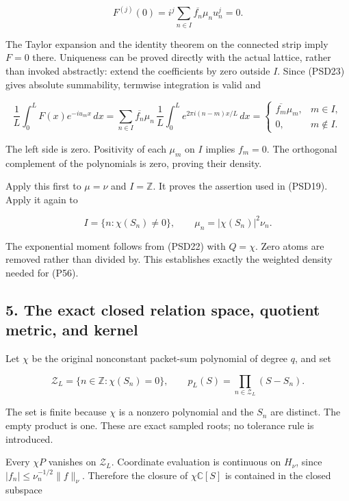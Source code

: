 \[
F^{(j)}(0)=i^j\sum_{n\in I}\overline{f_n}\mu_nu_n^j=0.
\tag{PSD25}
\]

The Taylor expansion and the identity theorem on the connected strip imply \(F=0\) there. Uniqueness can be proved directly with the actual lattice, rather than invoked abstractly: extend the coefficients by zero outside \(I\). Since (PSD23) gives absolute summability, termwise integration is valid and

\[
\frac1L\int_0^L F(x)e^{-iu_mx}\,dx
=\sum_{n\in I}\overline{f_n}\mu_n\,
\frac1L\int_0^L e^{2\pi i(n-m)x/L}\,dx
=\begin{cases}\overline{f_m}\mu_m,&m\in I,\\0,&m\notin I.\end{cases}
\tag{PSD26}
\]

The left side is zero. Positivity of each \(\mu_m\) on \(I\) implies \(f_m=0\). The orthogonal complement of the polynomials is zero, proving their density.

Apply this first to \(\mu=\nu\) and \(I=\mathbb Z\). It proves the assertion used in (PSD19). Apply it again to

\[
I=\{n:\chi(S_n)\ne0\},\qquad
\mu_n=|\chi(S_n)|^2\nu_n.
\tag{PSD27}
\]

The exponential moment follows from (PSD22) with \(Q=\chi\). Zero atoms are removed rather than divided by. This establishes exactly the weighted density needed for (P56).

\subsection{5. The exact closed relation space, quotient metric, and kernel}\label{GraphV2:the-exact-closed-relation-space-quotient-metric-and-kernel}

Let \(\chi\) be the original nonconstant packet-sum polynomial of degree \(q\), and set

\[
\mathcal Z_L=\{n\in\mathbb Z:\chi(S_n)=0\},\qquad
p_L(S)=\prod_{n\in\mathcal Z_L}(S-S_n).
\tag{PSD28}
\]

The set is finite because \(\chi\) is a nonzero polynomial and the \(S_n\) are distinct. The empty product is one. These are exact sampled roots; no tolerance rule is introduced.

Every \(\chi P\) vanishes on \(\mathcal Z_L\). Coordinate evaluation is continuous on \(H_\nu\), since \(|f_n|\le\nu_n^{-1/2}\|f\|_\nu\). Therefore the closure of \(\chi \mathbb{C}[S]\) is contained in the closed subspace


